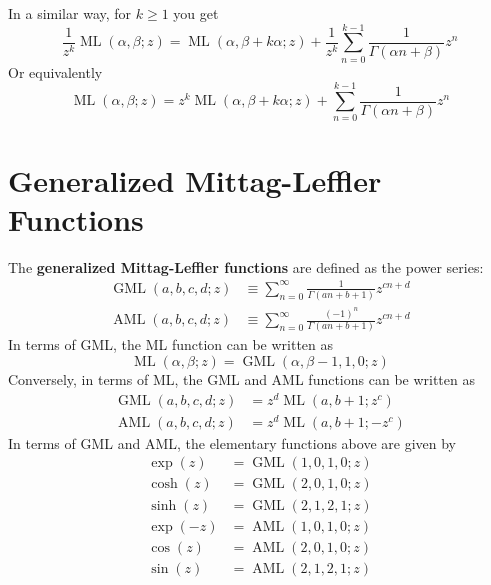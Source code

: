 In a similar way, for $k \geq 1$ you get
\begin{equation}
	\frac{1}{z^{k}} \operatorname{ML}(\alpha, \beta; z) = \operatorname{ML}(\alpha, \beta + k \alpha; z) + \frac{1}{z^{k}} \sum_{n = 0}^{k - 1} \frac{1}{\Gamma(\alpha n + \beta)} z^{n}
\end{equation}
Or equivalently
\begin{equation}
	\operatorname{ML}(\alpha, \beta; z) = z^{k} \operatorname{ML}(\alpha, \beta + k \alpha; z) + \sum_{n = 0}^{k - 1} \frac{1}{\Gamma(\alpha n + \beta)} z^{n}
\end{equation}
\section{Generalized Mittag-Leffler Functions}
The \textbf{generalized Mittag-Leffler functions} are defined as the power series:
\begin{align}
	\operatorname{GML}(a, b, c, d; z) & \equiv \sum_{n = 0}^{\infty} \frac{1}{\Gamma(a n + b + 1)} z^{cn+d}        \\
	\operatorname{AML}(a, b, c, d; z) & \equiv \sum_{n = 0}^{\infty} \frac{(-1)^{n}}{\Gamma(a n + b + 1)} z^{cn+d}
\end{align}
In terms of GML, the ML function can be written as
\begin{equation}
	\operatorname{ML}(\alpha, \beta; z) = \operatorname{GML}(\alpha, \beta - 1, 1, 0; z)
\end{equation}
Conversely, in terms of ML, the GML and AML functions can be written as
\begin{align}
	\operatorname{GML}(a, b, c, d; z) & = z^{d} \operatorname{ML}\left(a, b+1; z^{c}\right)  \\
	\operatorname{AML}(a, b, c, d; z) & = z^{d} \operatorname{ML}\left(a, b+1; -z^{c}\right)
\end{align}
In terms of GML and AML, the elementary functions above are given by
\begin{align}
	\exp(z)  & = \operatorname{GML}(1, 0, 1, 0; z) \\
	\cosh(z) & = \operatorname{GML}(2, 0, 1, 0; z) \\
	\sinh(z) & = \operatorname{GML}(2, 1, 2, 1; z) \\
	\exp(-z) & = \operatorname{AML}(1, 0, 1, 0; z) \\
	\cos(z)  & = \operatorname{AML}(2, 0, 1, 0; z) \\
	\sin(z)  & = \operatorname{AML}(2, 1, 2, 1; z)
\end{align}
